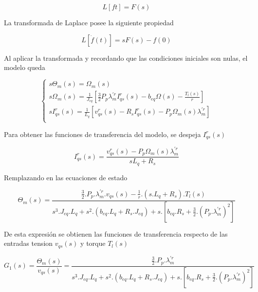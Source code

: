 \documentclass{article}
\begin{document}
\begin{equation}
        L[f{t}] = F(s)
\end{equation}

La transformada de Laplace posee la siguiente propiedad

\begin{equation}
        L[\dot{f}(t)] = s F(s) - f(0)
\end{equation}

Al aplicar la transformada y recordando que las condiciones iniciales son nulas, el 
modelo queda

\begin{equation}
    \begin{cases}
        s\Theta_{m}(s) = \Omega_{m}(s)\\
        s\Omega_{m}(s) = \frac{1}{J_{eq}}[\frac{3}{2} P_{p} \lambda_{m}^{\prime r} I_{qs}^r(s) - b_{eq}\Omega(s) - \frac{T_{l}(s)}{r}]\\
        s I_{qs}^r(s) = \frac{1}{L_{q}}[v_{qs}^r(s) - R_{s}I_{qs}^r(s) - P_{p}\Omega_{m}(s)\lambda_{m}^{\prime r}]\\
    \end{cases}
\end{equation}

Para obtener las funciones de transferencia del modelo, se despeja $I_{qs}^r(s)$

\begin{equation}
    I_{qs}^r(s) = \frac{v_{qs}^r(s) - P_{p}\Omega_{m}(s)\lambda_{m}^{\prime r}}{s L_{q} + R_{s}}
\end{equation}
 
Remplazando en las ecuaciones de estado 

\begin{equation}
    \Theta_{m}(s) = \frac{\frac{3}{2}.P_{p}.\lambda_{m}^{\prime r}.v_{qs}(s) - \frac{1}{r}.(s.L_{q}+R_{s}).T_{l}(s)}{s^3.J_{eq}.L_{q} + s^2.(b_{eq}.L_{q} +  R_{s}.J_{eq}) + s.[b_{eq}.R_{s}+\frac{3}{2}.(P_{p}.\lambda_{m}^{\prime r})^2]}
\end{equation}

De esta expresión se obtienen las funciones de transferencia respecto de las entradas tension $v_{qs}(s)$ y torque $T_{l}(s)$

\begin{equation}\label{eq.trasnferencia_1}
    G_{1}(s) = \frac{\Theta_{m}(s)}{v_{qs}(s)} = \frac{\frac{3}{2}.P_{p}.\lambda_{m}^{\prime r}}{s^3.J_{eq}.L_{q} + s^2.(b_{eq}.L_{q} +  R_{s}.J_{eq}) + s.[b_{eq}.R_{s}+\frac{3}{2}.(P_{p}.\lambda_{m}^{\prime r})^2]}
\end{equation}
\end{document}
